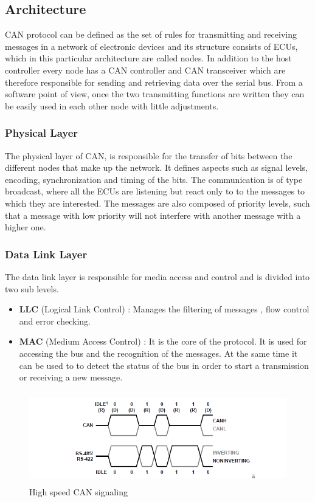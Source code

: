 \documentclass{article}
\begin{document}
\subsection{Architecture}
CAN protocol can be defined as the set of rules for transmitting and receiving messages in a network of electronic devices and its structure consists of ECUs, which in this particular architecture are called nodes. In addition to the host controller every node has a CAN controller and CAN transceiver which are therefore responsible for sending and retrieving data over the serial bus. From a software point of view, once the two transmitting functions are written they can be easily used in each other node with little adjustments. 

\subsubsection{Physical Layer}
The physical layer of CAN, is responsible for the transfer of bits between the different nodes that make up the network. It defines aspects such as signal levels, encoding, synchronization and timing of the bits. The communication is of type broadcast, where all the ECUs are listening but react only to to the messages to which they are interested. The messages are also composed of priority levels, such that a message with low priority will not interfere with another message with a higher one.

\subsubsection{Data Link Layer}
The data link layer is responsible for media access and control
and is divided into two sub levels.
\begin{itemize}
    \item \textbf{LLC} (Logical Link Control)  : Manages the filtering of messages , flow control and error checking.
    \item \textbf{MAC} (Medium Access Control) : It is the core of the protocol. It is used for accessing the bus and the recognition of the
            messages. At the same time it can be used to to detect the status of the bus in order to start a transmission or receiving a new message. 
\end{itemize}

\begin{figure}[h]    
    \centering
    \includegraphics[width=13cm, height=4cm,center]{images/can_high_low}
    \caption{High speed CAN signaling}
\end{figure}
\end{document}
